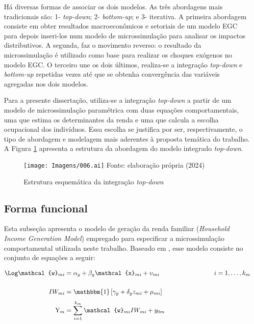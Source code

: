 Há diversas formas de associar os dois modelos. As três abordagens mais tradicionais são: 1- \textit{top-down}; 2- \textit{bottom-up}; e 3- iterativa. A primeira abordagem consiste em obter resultados macroeconômicos e setoriais de um modelo EGC para depois inseri-los num modelo de microssimulação para analisar os impactos distributivos. A segunda, faz o movimento reverso: o resultado da microssimulação é utilizado como base para realizar os choques exógenos no modelo EGC. O terceiro une os dois últimos, realiza-se a integração \textit{top-down} e \textit{bottom-up} repetidas vezes até que se obtenha convergência das variáveis agregadas nos dois modelos.

Para a presente dissertação, utiliza-se a integração \textit{top-down} a partir de um modelo de microssimulação paramétrica com duas equações comportamentais, uma que estima os determinantes da renda e uma que calcula a escolha ocupacional dos indivíduos. Essa escolha se justifica por ser, respectivamente, o tipo de abordagem e modelagem mais aderentes à proposta temática do trabalho. A Figura \ref{fig:microssimulacao} apresenta a estrutura da abordagem do modelo integrado \textit{top-down}.

\begin{landscape}
	\begin{figure}
		\centering
		\caption{Estrutura esquemática da integração \textit{top-down}} \label{fig:microssimulacao}
		\texttt{[image: Imagens/006.ai]}
		\footnotesize
		Fonte: elaboração própria (2024)
	\end{figure}
\end{landscape}


\subsection{Forma funcional} \label{subsec:forma_funcional}

Esta subseção apresenta o modelo de geração da renda familiar (\textit{Household Income Generation Model}) empregado para especificar a microssimulação comportamental utilizada neste trabalho. Baseado em \textcite{bourguignon05}, esse modelo consiste no conjunto de equações a seguir:

\begin{align}
	\Log \mathcal{w}_{mi}  &= \alpha_{g} + \beta_{g} \mathcal{x}_{mi} + \upsilon_{mi} \hspace{3cm} i = 1, \ldots, k_m \label{eq:renda} \\[0.5cm]
	IW_{mi}                &= \mathbbm{1} \left[\gamma_{g} + \delta_{g} z_{mi} + \mu_{mi} \right] \label{eq:ocm} \\[0.1cm]
	\text{Y}_{m}           &= \sum_{i = 1}^{k_{m}} \mathcal{w}_{mi} IW_{mi} + y_{0m} \label{eq:renda_familiar}
\end{align}

